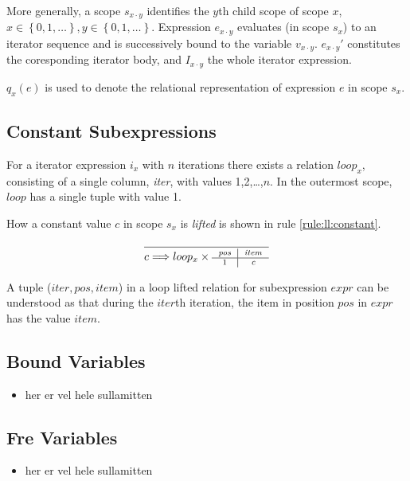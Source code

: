 More generally, a scope $s_{x \cdot y}$ identifies the $y$th child scope of scope $x$, $x \in \left\{ 0,1,\ldots
\right\}, y \in \left\{ 0,1,\ldots \right\}$. Expression $e_{x\cdot y}$ evaluates (in scope $s_{x}$) to an
iterator sequence and is successively bound to the variable $v_{x \cdot y}$. $e_{x \cdot y}'$ constitutes the
coresponding iterator body, and $I_{x \cdot y}$ the whole iterator expression.

$q_{x}(e)$ is used to denote the relational representation of expression $e$ in scope $s_{x}$.


\subsection{Constant Subexpressions}
\label{sect:translation:ll:ConstExprs}

For a iterator expression $i_{x}$ with $n$ iterations there exists a relation $loop_{x}$, consisting of a
single column, \textit{iter}, with values 1,2,\ldots,$n$. In the outermost scope, $loop$ has a single tuple with
value 1.

How a constant value $c$ in scope $s_{x}$ is \textit{lifted} is shown in rule \ref{rule:ll:constant}.

\begin{equation}
\frac{}{c \Longrightarrow loop_{x} \times \mbox{\scriptsize \begin{tabular}{c|c} \textit{pos}&\textit{item} \\
\hline 1 & \textit{c}
\end{tabular}}}
\label{rule:ll:constant}
\end{equation}

A tuple ($iter,pos,item$) in a loop lifted relation for subexpression $expr$ can be understood as that during the
$iter$th iteration, the item in position $pos$ in $expr$ has the value $item$.

\subsection{Bound Variables}
\label{sect:translation:ll:boundVar}
\begin{itemize}
  \item her er vel hele sullamitten
\end{itemize}

\subsection{Fre Variables}
\label{sect:translation:ll:freeVar}
\begin{itemize}
  \item her er vel hele sullamitten
\end{itemize}

